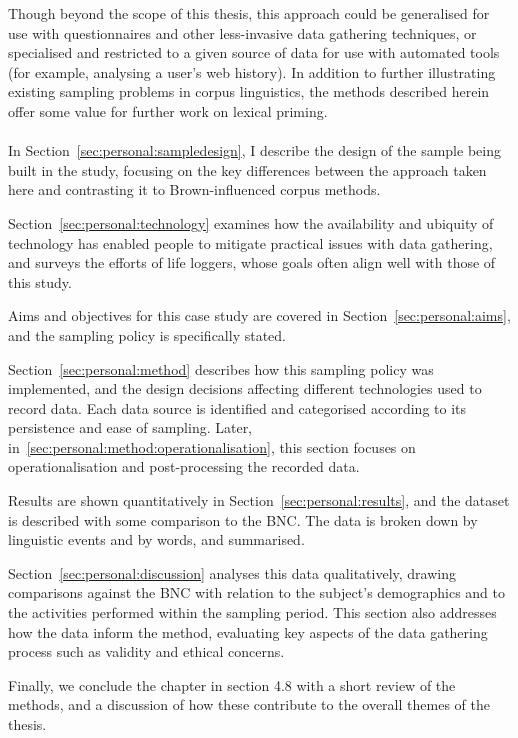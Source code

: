 Though beyond the scope of this thesis, this approach could be generalised for use with questionnaires and other less-invasive data gathering techniques, or specialised and restricted to a given source of data for use with automated tools (for example, analysing a user's web history).  In addition to further illustrating existing sampling problems in corpus linguistics, the methods described herein offer some value for further work on lexical priming.


\paragraph{}
In Section~\ref{sec:personal:sampledesign}, I describe the design of the sample being built in the study, focusing on the key differences between the approach taken here and contrasting it to Brown-influenced corpus methods.

Section~\ref{sec:personal:technology} examines how the availability and ubiquity of technology has enabled people to mitigate practical issues with data gathering, and surveys the efforts of life loggers, whose goals often align well with those of this study.

Aims and objectives for this case study are covered in Section~\ref{sec:personal:aims}, and the sampling policy is specifically stated.

Section~\ref{sec:personal:method} describes how this sampling policy was implemented, and the design decisions affecting different technologies used to record data.  Each data source is identified and categorised according to its persistence and ease of sampling.  Later, in~\ref{sec:personal:method:operationalisation}, this section focuses on operationalisation and post-processing the recorded data.

Results are shown quantitatively in Section~\ref{sec:personal:results}, and the dataset is described with some comparison to the BNC\@.  The data is broken down by linguistic events and by words, and summarised.

Section~\ref{sec:personal:discussion} analyses this data qualitatively, drawing comparisons against the BNC with relation to the subject's demographics and to the activities performed within the sampling period.  This section also addresses how the data inform the method, evaluating key aspects of the data gathering process such as validity and ethical concerns.

Finally, we conclude the chapter in section 4.8 with a short review of the methods, and a discussion of how these contribute to the overall themes of the thesis.

